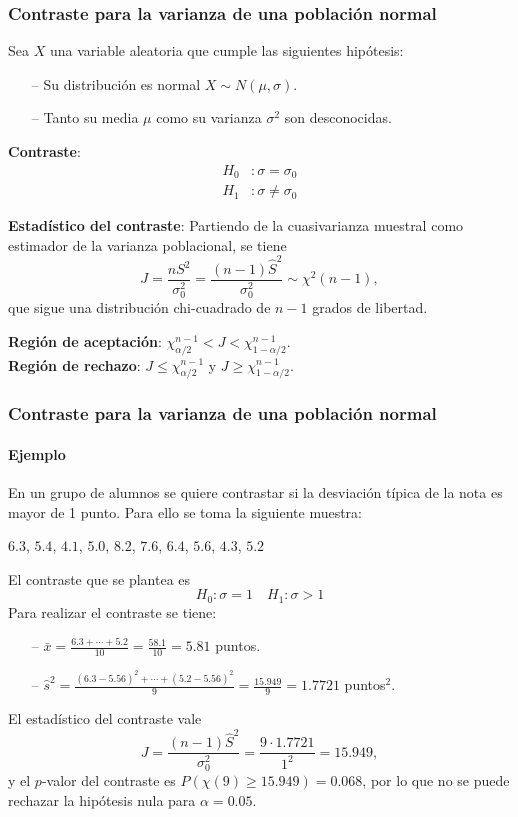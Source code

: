 \begin{frame}
\frametitle{Contraste para la varianza de una población normal}
Sea $X$ una variable aleatoria que cumple las siguientes hipótesis:
\begin{itemize}
\item[--] Su distribución es normal $X\sim N(\mu,\sigma)$.
\item[--] Tanto su media $\mu$ como su varianza $\sigma^2$ son desconocidas.
\end{itemize}
\textbf{Contraste}:
\begin{align*} 
H_0 &: \sigma=\sigma_0\\
H_1 &: \sigma\neq \sigma_0
\end{align*}

\textbf{Estadístico del contraste}: Partiendo de la cuasivarianza muestral como estimador de la varianza poblacional,
se tiene
\[
J=\frac{nS^2}{\sigma_0^2} = \frac{(n-1)\hat{S}^2}{\sigma_0^2}\sim \chi^2(n-1),
\]
que sigue una distribución chi-cuadrado de $n-1$ grados de libertad.

\textbf{Región de aceptación}: $\chi^{n-1}_{\alpha/2}< J < \chi^{n-1}_{1-\alpha/2}$.\\
\textbf{Región de rechazo}: $J\leq \chi^{n-1}_{\alpha/2}$ y $J\geq \chi^{n-1}_{1-\alpha/2}$.
\end{frame}


\begin{frame}
\frametitle{Contraste para la varianza de una población normal}
\framesubtitle{Ejemplo}
En un grupo de alumnos se quiere contrastar si la desviación típica de la nota es mayor de 1 punto.
Para ello se toma la siguiente muestra:
\begin{center}
$6.3$, $5.4$, $4.1$, $5.0$, $8.2$, $7.6$, $6.4$, $5.6$, $4.3$, $5.2$
\end{center} 
El contraste que se plantea es
\[
H_0: \sigma=1 \quad H_1: \sigma>1
\]
Para realizar el contraste se tiene:
\begin{itemize}
\item[--] $\bar x = \frac{6.3+\cdots+5.2}{10}=\frac{58.1}{10}=5.81$ puntos.
\item[--] $\hat s^2 = \frac{(6.3-5.56)^2+\cdots+(5.2-5.56)^2}{9} = \frac{15.949}{9}=1.7721$ puntos$^2$.
\end{itemize}
El estadístico del contraste vale
\[
J= \frac{(n-1)\hat{S}^2}{\sigma_0^2} = \frac{9\cdot1.7721}{1^2} = 15.949,
\]
y el $p$-valor del contraste es $P(\chi(9)\geq 15.949) = 0.068$, por lo que no se puede rechazar la hipótesis nula
para $\alpha=0.05$.
\end{frame}


